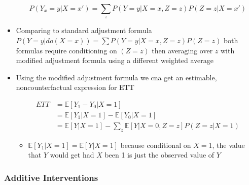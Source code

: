 \documentclass[]{article}
\providecommand{\tightlist}{%
  \setlength{\itemsep}{0pt}\setlength{\parskip}{0pt}}
\begin{document}
\begin{itemize}
  \begin{equation}\label{eq:4.21}
  P(Y_x = y| X = x') = \sum\limits_z P(Y = y|X = x, Z = z)P(Z = z|X = x')
  \end{equation}
\item
  Comparing to standard adjustment formula
  \(P(Y = y| do(X = x)) = \sum P(Y = y|X = x, Z = z)P(Z =z)\) both
  formulas require conditioning on \((Z = z)\) then averaging over \(z\)
  with modified adjustment formula using a different weighted average
\item
  Using the modified adjustment formula we cna get an estimable,
  noncounterfactual expression for ETT

  \begin{equation*}
    \begin{split}
  ETT &= \mathbb{E}[Y_1 - Y_0|X = 1] \\
  &= \mathbb{E}[Y_1| X = 1] - \mathbb{E}[Y_0|X = 1] \\
  &= \mathbb{E}[Y|X = 1] - \sum\limits_z \mathbb{E}[Y|X=0, Z = z]P(Z = z|X = 1)
    \end{split}
  \end{equation*}

  \begin{itemize}
  \tightlist
  \item
    \(\mathbb{E}[Y_1|X = 1] = \mathbb{E}[Y|X=1]\) because conditional on
    \(X = 1\), the value that \(Y\) would get had \(X\) been 1 is just
    the observed value of \(Y\)
  \end{itemize}
\end{itemize}

\subsubsection{Additive Interventions}\label{additive-interventions}
\end{document}
